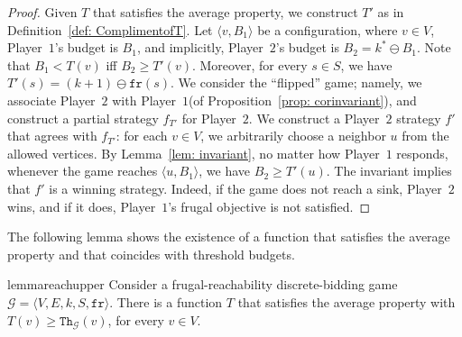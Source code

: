 \documentclass{article}\providecommand{\nequiv}{\not\equiv}\usepackage[a4paper,margin=20mm]{geometry}
\newcommand{\PO}{Player~$1$\xspace}
\newcommand{\PT}{Player~$2$\xspace}
\newcommand{\G}{{\mathcal G}}
\newcommand{\fr}{\texttt{fr}}
\newcommand{\thresh}{\texttt{Th}\xspace}
\newcommand{\zug}[1]{\langle #1  \rangle}
\begin{document}
\begin{proof}


Given $T$ that satisfies the average property, we construct $T'$ as in Definition~\ref{def: ComplimentofT}. 
Let $\zug{v, B_1}$ be a configuration, where $v \in V$, \PO's budget is $B_1$, and implicitly, \PT's budget is $B_2 = k^* \ominus B_1$. Note that $B_1 < T(v)$ iff $B_2 \geq T'(v)$. Moreover, for every $s \in S$, we have $T'(s) = (k+1) \ominus \fr(s)$. 
We consider the ``flipped'' game; namely, we associate \PT with \PO (of Proposition~\ref{prop: corinvariant}), and construct a partial strategy $f_{T'}$ for \PT. %
 We construct a \PT strategy $f'$ that agrees with $f_{T'}$: for each $v \in V$, we arbitrarily choose a neighbor $u$ from the allowed vertices. By Lemma~\ref{lem: invariant}, no matter how \PO responds, whenever the game reaches $\zug{u, B_1}$, we have $B_2 \geq T'(u)$. The invariant implies that $f'$ is a winning strategy. Indeed, if the game does not reach a sink, \PT wins, and if it does, \PO's frugal objective is not satisfied. 
\end{proof}


The following lemma shows the existence of a function that satisfies the average property and that coincides with threshold budgets.




\begin{restatable}{lemma}{reachupper}
\label{lem:reach-upper}
Consider a frugal-reachability discrete-bidding game $\G = \zug{V, E, k, S, \fr}$. There is a function $T$ %
that satisfies the average property with $T(v) \geq \thresh_\G(v)$, for every $v \in V$.
\end{restatable}
\end{document}
